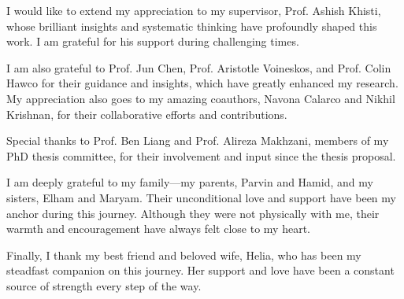 \begin{spacing}{1.5}

I would like to extend my appreciation to my supervisor, Prof. Ashish Khisti, whose brilliant insights and systematic thinking have profoundly shaped this work. I am grateful for his support during challenging times.

I am also grateful to Prof. Jun Chen, Prof. Aristotle Voineskos, and Prof. Colin Hawco for their guidance and insights, which have greatly enhanced my research. My appreciation also goes to my amazing coauthors, Navona Calarco and Nikhil Krishnan, for their collaborative efforts and contributions.

Special thanks to Prof. Ben Liang and Prof. Alireza Makhzani, members of my PhD thesis committee, for their involvement and input since the thesis proposal.

I am deeply grateful to my family—my parents, Parvin and Hamid, and my sisters, Elham and Maryam. Their unconditional love and support have been my anchor during this journey. Although they were not physically with me, their warmth and encouragement have always felt close to my heart.

Finally, I thank my best friend and beloved wife, Helia, who has been my steadfast companion on this journey. Her support and love have been a constant source of strength every step of the way.

\end{spacing}
